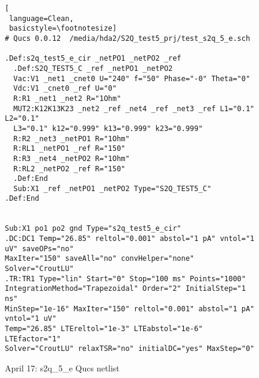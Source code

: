\begin{figure}
\begin{lstlisting}[
 language=Clean, 
 basicstyle=\footnotesize]
# Qucs 0.0.12  /media/hda2/S2Q_test5_prj/test_s2q_5_e.sch

.Def:s2q_test5_e_cir _netPO1 _netPO2 _ref
  .Def:S2Q_TEST5_C _ref _netPO1 _netPO2
  Vac:V1 _net1 _cnet0 U="240" f="50" Phase="-0" Theta="0"
  Vdc:V1 _cnet0 _ref U="0"
  R:R1 _net1 _net2 R="1Ohm"
  MUT2:K12K13K23 _net2 _ref _net4 _ref _net3 _ref L1="0.1" L2="0.1"
  L3="0.1" k12="0.999" k13="0.999" k23="0.999"
  R:R2 _net3 _netPO1 R="1Ohm"
  R:RL1 _netPO1 _ref R="150"
  R:R3 _net4 _netPO2 R="1Ohm"
  R:RL2 _netPO2 _ref R="150"
  .Def:End
  Sub:X1 _ref _netPO1 _netPO2 Type="S2Q_TEST5_C"
.Def:End


Sub:X1 po1 po2 gnd Type="s2q_test5_e_cir"
.DC:DC1 Temp="26.85" reltol="0.001" abstol="1 pA" vntol="1 uV" saveOPs="no" 
MaxIter="150" saveAll="no" convHelper="none" Solver="CroutLU"
.TR:TR1 Type="lin" Start="0" Stop="100 ms" Points="1000" 
IntegrationMethod="Trapezoidal" Order="2" InitialStep="1 ns" 
MinStep="1e-16" MaxIter="150" reltol="0.001" abstol="1 pA" vntol="1 uV" 
Temp="26.85" LTEreltol="1e-3" LTEabstol="1e-6" LTEfactor="1" 
Solver="CroutLU" relaxTSR="no" initialDC="yes" MaxStep="0"

\end{lstlisting}

 \caption{April 17: s2q\_5\_e Qucs netlist}
  \label{fig:s2q_5_e_qucs}
\end{figure} 



